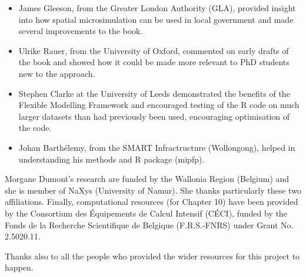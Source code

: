  \begin{itemize}
   \item James Gleeson, from the Greater London Authority (GLA), provided insight
   into how spatial microsimulation can be used in local government and made several
   improvements to the book.
   \item Ulrike Rauer, from the University of Oxford, commented on
   early drafts of the book and showed how it could be made more relevant to PhD
   students new to the approach.
   \item Stephen Clarke at the University of Leeds demonstrated the benefits of
   the Flexible Modelling Framework and encouraged testing of the R code on much
   larger datasets than had previously been used, encouraging optimisation of the code.
   \item Johan Barthélemy, from the SMART Infractructure (Wollongong), helped in 
   understanding his methods and R package (mipfp).
 \end{itemize}
 
 Morgane Dumont's research are funded by the Wallonia Region (Belgium) and she 
 is member of NaXys (University of Namur). She thanks particularly these two affiliations.
 Finally, computational resources (for Chapter 10) have been provided by the Consortium des Équipements de 
 Calcul Intensif (CÉCI), funded by the Fonds de la Recherche Scientifique de Belgique 
 (F.R.S.-FNRS) under Grant No. 2.5020.11.
 
 Thanks also to all the people
 who provided the wider resources for this project to happen.


